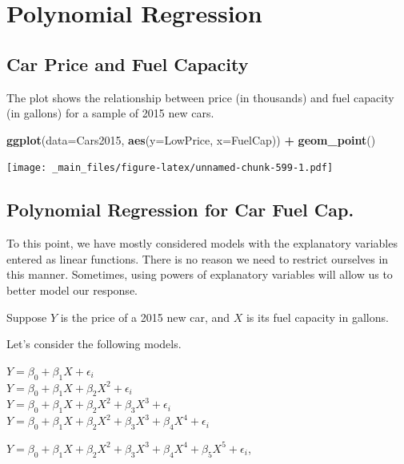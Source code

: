 \documentclass[]{book}
\newenvironment{Shaded}{\begin{snugshade}}{\end{snugshade}}
\newcommand{\KeywordTok}[1]{\textcolor[rgb]{0.13,0.29,0.53}{\textbf{#1}}}
\newcommand{\DataTypeTok}[1]{\textcolor[rgb]{0.13,0.29,0.53}{#1}}
\newcommand{\StringTok}[1]{\textcolor[rgb]{0.31,0.60,0.02}{#1}}
\newcommand{\OperatorTok}[1]{\textcolor[rgb]{0.81,0.36,0.00}{\textbf{#1}}}
\newcommand{\NormalTok}[1]{#1}
\begin{document}
\section{Polynomial Regression}\label{polynomial-regression}

\subsection{Car Price and Fuel
Capacity}\label{car-price-and-fuel-capacity}

The plot shows the relationship between price (in thousands) and fuel
capacity (in gallons) for a sample of 2015 new cars.

\begin{Shaded}
\begin{Highlighting}[]
\KeywordTok{ggplot}\NormalTok{(}\DataTypeTok{data=}\NormalTok{Cars2015, }\KeywordTok{aes}\NormalTok{(}\DataTypeTok{y=}\NormalTok{LowPrice, }\DataTypeTok{x=}\NormalTok{FuelCap)) }\OperatorTok{+}\StringTok{ }\KeywordTok{geom_point}\NormalTok{()}
\end{Highlighting}
\end{Shaded}

\texttt{[image: \_main\_files/figure-latex/unnamed-chunk-599-1.pdf]}

\subsection{Polynomial Regression for Car Fuel
Cap.}\label{polynomial-regression-for-car-fuel-cap.}

To this point, we have mostly considered models with the explanatory
variables entered as linear functions. There is no reason we need to
restrict ourselves in this manner. Sometimes, using powers of
explanatory variables will allow us to better model our response.

Suppose \(Y\) is the price of a 2015 new car, and \(X\) is its fuel
capacity in gallons.

Let's consider the following models.

\(Y=\beta_0 + \beta_1 X + \epsilon_i\)\\
\(Y=\beta_0 + \beta_1 X + \beta_2X^2 + \epsilon_i\)\\
\(Y=\beta_0 + \beta_1 X + \beta_2X^2+ \beta_3X^3 + \epsilon_i\)\\
\(Y=\beta_0 + \beta_1 X + \beta_2X^2+ \beta_3X^3+ \beta_4X^4+ \epsilon_i\)

\(Y=\beta_0 + \beta_1 X + \beta_2X^2+ \beta_3X^3+ \beta_4X^4+ \beta_5X^5 +\epsilon_i\),
\end{document}
